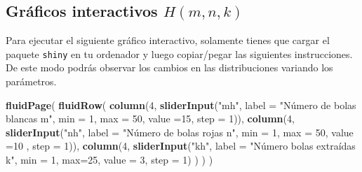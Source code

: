 \documentclass[]{book}
\newenvironment{Shaded}{\begin{snugshade}}{\end{snugshade}}
\newcommand{\DataTypeTok}[1]{\textcolor[rgb]{0.13,0.29,0.53}{#1}}
\newcommand{\DecValTok}[1]{\textcolor[rgb]{0.00,0.00,0.81}{#1}}
\newcommand{\KeywordTok}[1]{\textcolor[rgb]{0.13,0.29,0.53}{\textbf{#1}}}
\newcommand{\NormalTok}[1]{#1}
\newcommand{\StringTok}[1]{\textcolor[rgb]{0.31,0.60,0.02}{#1}}
\begin{document}
\hypertarget{gruxe1ficos-interactivos-hmnk}{%
\subsection{\texorpdfstring{Gráficos interactivos \(H(m,n,k)\)}{Gráficos interactivos H(m,n,k)}}\label{gruxe1ficos-interactivos-hmnk}}

Para ejecutar el siguiente gráfico interactivo, solamente tienes que cargar el paquete \texttt{shiny} en tu ordenador y luego copiar/pegar las siguientes instrucciones. De este modo podrás observar los cambios en las distribuciones variando los parámetros.

\begin{Shaded}
\begin{Highlighting}[]
\KeywordTok{fluidPage}\NormalTok{(}
\KeywordTok{fluidRow}\NormalTok{(}
  \KeywordTok{column}\NormalTok{(}\DecValTok{4}\NormalTok{,}
         \KeywordTok{sliderInput}\NormalTok{(}\StringTok{"mh"}\NormalTok{, }\DataTypeTok{label =} \StringTok{"Número de bolas blancas m"}\NormalTok{,}
              \DataTypeTok{min =} \DecValTok{1}\NormalTok{, }\DataTypeTok{max =} \DecValTok{50}\NormalTok{, }\DataTypeTok{value =}\DecValTok{15}\NormalTok{, }\DataTypeTok{step =} \DecValTok{1}\NormalTok{)),}
  \KeywordTok{column}\NormalTok{(}\DecValTok{4}\NormalTok{,}
         \KeywordTok{sliderInput}\NormalTok{(}\StringTok{"nh"}\NormalTok{, }\DataTypeTok{label =} \StringTok{"Número de bolas rojas n"}\NormalTok{,}
              \DataTypeTok{min =} \DecValTok{1}\NormalTok{, }\DataTypeTok{max =} \DecValTok{50}\NormalTok{, }\DataTypeTok{value =}\DecValTok{10}\NormalTok{ , }\DataTypeTok{step =} \DecValTok{1}\NormalTok{)),}
  \KeywordTok{column}\NormalTok{(}\DecValTok{4}\NormalTok{,}
          \KeywordTok{sliderInput}\NormalTok{(}\StringTok{"kh"}\NormalTok{, }\DataTypeTok{label =} \StringTok{"Número bolas extraídas k"}\NormalTok{,}
                     \DataTypeTok{min =} \DecValTok{1}\NormalTok{, }\DataTypeTok{max=}\DecValTok{25}\NormalTok{, }\DataTypeTok{value =} \DecValTok{3}\NormalTok{, }\DataTypeTok{step =} \DecValTok{1}\NormalTok{)}
\NormalTok{         )}
\NormalTok{  )}
\NormalTok{)}


\end{Highlighting}
\end{Shaded}
\end{document}
